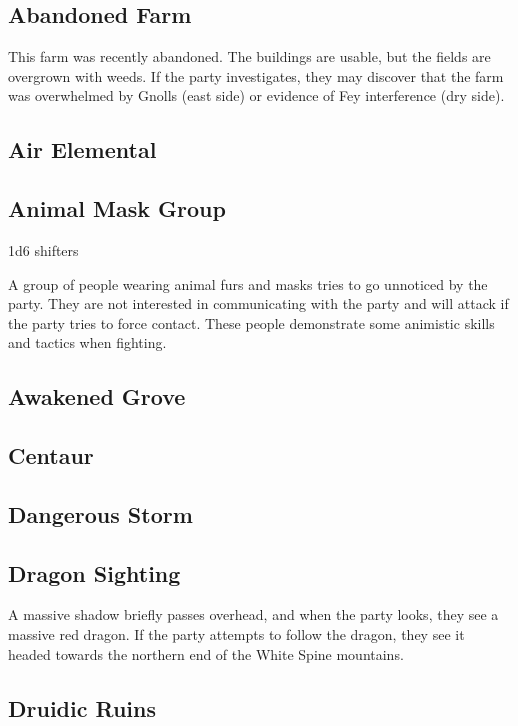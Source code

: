 \subsection{Abandoned Farm}

This farm was recently abandoned.
The buildings are usable, but the fields are overgrown with weeds.
If the party investigates, they may discover that the farm was overwhelmed by Gnolls (east side) or evidence of Fey interference (dry side).

\subsection{Air Elemental}

\subsection{Animal Mask Group}

1d6 shifters

A group of people wearing animal furs and masks tries to go unnoticed by the party.
They are not interested in communicating with the party and will attack if the party tries to force contact.
These people demonstrate some animistic skills and tactics when fighting.

\subsection{Awakened Grove}

\subsection{Centaur}

\subsection{Dangerous Storm}

\subsection{Dragon Sighting}

A massive shadow briefly passes overhead, and when the party looks, they see a massive red dragon.
If the party attempts to follow the dragon, they see it headed towards the northern end of the White Spine mountains.

\subsection{Druidic Ruins}

